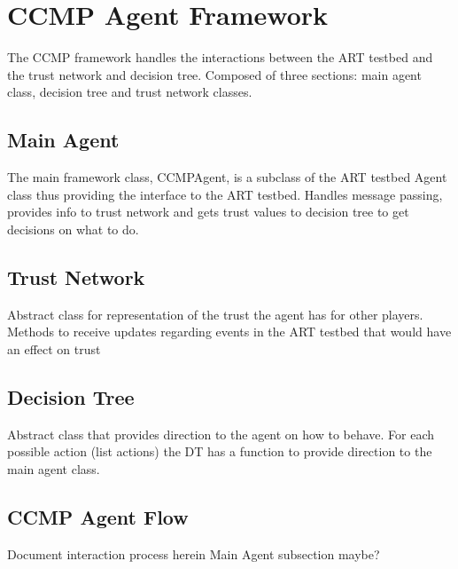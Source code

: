 \section{CCMP Agent Framework}
The CCMP framework handles the interactions between the ART testbed and the
trust network and decision tree.  Composed of three sections: main agent
class, decision tree and trust network classes.

\subsection{Main Agent}
The main framework class, CCMPAgent, is a subclass of the ART testbed Agent
class thus providing the interface to the ART testbed.  Handles message
passing, provides info to trust network and gets trust values to decision tree
to get decisions on what to do.

\subsection{Trust Network}
Abstract class for representation of the trust the agent has for other players.
Methods to receive updates regarding events in the ART testbed that would have
an effect on trust

\subsection{Decision Tree}
Abstract class that provides direction to the agent on how to behave.  For each
possible action (list actions) the DT has a function to provide direction to
the main agent class.

\subsection{CCMP Agent Flow}
Document interaction process here\ldotsor in Main Agent subsection maybe?